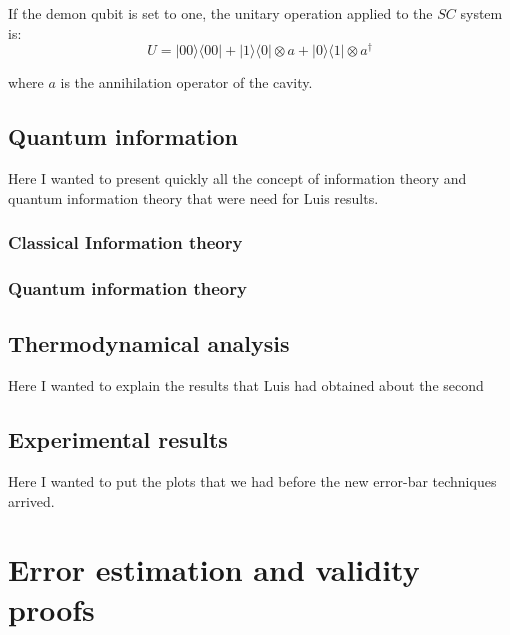 \documentclass[10pt]{report}
\theoremstyle{plain}
\theoremstyle{definition}
\theoremstyle{remark}
\newcommand{\ket}[1]{|#1\rangle}
\newcommand{\bra}[1]{\langle#1|}
\begin{document}
If the demon qubit is set to one, the unitary operation applied to the $SC$
system is:
\[U = \ket{00}\bra{00} + \ket 1 \bra 0 \otimes a + \ket 0 \bra 1 \otimes a^\dagger\]

where $a$ is the annihilation operator of the cavity.



\section{Quantum information}

Here I wanted to present quickly all the concept of information theory and
quantum information theory that were need for Luis results.

\subsection{Classical Information theory}



\subsection{Quantum information theory}


\section{Thermodynamical analysis}

Here I wanted to explain the results that Luis had obtained about the second

\section{Experimental results}

Here I wanted to put the plots that we had before the new error-bar techniques arrived.

\chapter{Error estimation and validity proofs}
\end{document}
